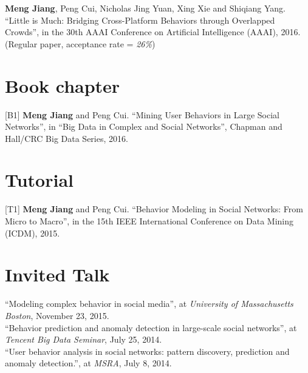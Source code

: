 \documentclass[margin, 10pt]{res} %
\begin{document}
\begin{resume}
[C9] {\bf Meng Jiang}, Peng Cui, Nicholas Jing Yuan, Xing Xie and Shiqiang Yang. ``Little is Much: Bridging Cross-Platform Behaviors through Overlapped Crowds'', in the 30th AAAI Conference on Artificial Intelligence (AAAI), 2016. (Regular paper, acceptance rate = {\em 26\%})


\section{Book chapter}

[B1] {\bf Meng Jiang} and Peng Cui. ``Mining User Behaviors in Large Social Networks'', in ``Big Data in Complex and Social Networks'', Chapman and Hall/CRC Big Data Series, 2016.


\section{Tutorial}

[T1] {\bf Meng Jiang} and Peng Cui. ``Behavior Modeling in Social Networks: From Micro to Macro'', in the 15th IEEE International Conference on Data Mining (ICDM), 2015.


\section{Invited Talk}

``Modeling complex behavior in social media'', at {\em University of Massachusetts Boston}, November 23, 2015. \\
``Behavior prediction and anomaly detection in large-scale social networks'', at {\em Tencent Big Data Seminar}, July 25, 2014. \\
``User behavior analysis in social networks: pattern discovery, prediction and anomaly detection.'', at {\em MSRA}, July 8, 2014.


\end{resume}
\end{document}
